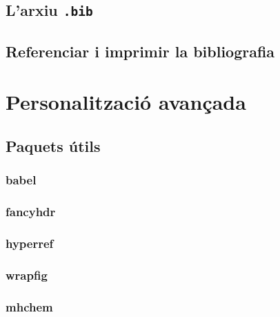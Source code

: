 \documentclass[15pt,twosides,onecolumn,openany]{book}
\begin{document}
\section{L'arxiu \texttt{.bib}}
\section{Referenciar i imprimir la bibliografia}

\chapter{Personalització avançada}
\section{Paquets útils}
\subsection{babel}
\subsection{fancyhdr}
\subsection{hyperref}
\subsection{wrapfig}
\subsection{mhchem}
\end{document}
